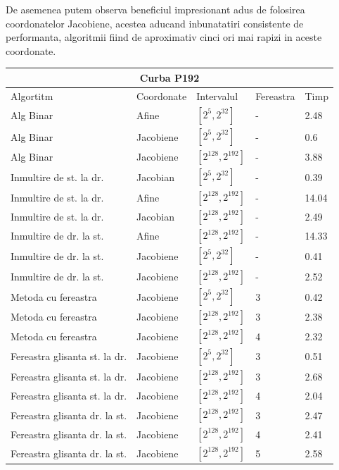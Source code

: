 De asemenea putem observa beneficiul impresionant adus de folosirea coordonatelor Jacobiene, acestea aducand inbunatatiri consistente de performanta, algoritmii fiind de aproximativ cinci ori mai rapizi in aceste coordonate. 


\begin{tabular}{ |p{5cm}||p{3cm}|p{3cm}|p{2cm}|p{1cm}|  }
 \hline
 \multicolumn{5}{|c|}{Curba P192} \\
 \hline
 Algortitm& Coordonate &Intervalul &Fereastra &Timp\\
 \hline
 Alg Binar & Afine  &$[2^{5},2^{32}]$& - & 2.48\\
 Alg Binar&Jacobiene  & $[2^{5},2^{32}]$ & - & 0.6\\
 Alg Binar&Jacobiene  & $[2^{128},2^{192}]$ & - & 3.88\\
 Inmultire de st. la dr. & Jacobian & $[2^{5},2^{32}]$& - & 0.39\\
 Inmultire de st. la dr. & Afine & $[2^{128},2^{192}]$& - & 14.04\\
 Inmultire de st. la dr. & Jacobian & $[2^{128},2^{192}]$& - & 2.49\\
 Inmultire de dr. la st. &Afine & $[2^{128},2^{192}]$ & - & 14.33\\
 Inmultire de dr. la st. &Jacobiene & $[2^{5},2^{32}]$ & - & 0.41\\
 Inmultire de dr. la st. &Jacobiene & $[2^{128},2^{192}]$ & - & 2.52\\
 Metoda cu fereastra& Jacobiene & $[2^{5},2^{32}]$ & 3 & 0.42\\
 Metoda cu fereastra& Jacobiene & $[2^{128},2^{192}]$ & 3 & 2.38\\
 Metoda cu fereastra& Jacobiene & $[2^{128},2^{192}]$ & 4 & 2.32\\
 Fereastra glisanta st. la dr.& Jacobiene  & $[2^{5},2^{32}]$& 3 & 0.51\\
 Fereastra glisanta st. la dr.& Jacobiene  & $[2^{128},2^{192}]$& 3 & 2.68\\
  Fereastra glisanta st. la dr.& Jacobiene  & $[2^{128},2^{192}]$& 4 & 2.04\\
 Fereastra glisanta dr. la st.& Jacobiene  & $[2^{128},2^{192}]$& 3 & 2.47\\
 Fereastra glisanta dr. la st.& Jacobiene  & $[2^{128},2^{192}]$& 4 & 2.41\\
 Fereastra glisanta dr. la st.& Jacobiene  & $[2^{128},2^{192}]$& 5 & 2.58\\
 \hline
\end{tabular}

